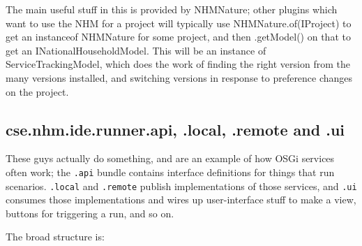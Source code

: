 \documentclass[11pt]{article}
\begin{document}
The main useful stuff in this is provided by NHMNature; other plugins which want to use the NHM for a project will typically use NHMNature.of(IProject) to get an instanceof NHMNature for some project, and then .getModel() on that to get an INationalHouseholdModel. This will be an instance of ServiceTrackingModel, which does the work of finding the right version from the many versions installed, and switching versions in response to preference changes on the project.

\subsection{cse.nhm.ide.runner.api, .local, .remote and .ui}
\label{sec-1-5}
These guys actually do something, and are an example of how OSGi services often work; the \texttt{.api} bundle contains interface definitions for things that run scenarios. \texttt{.local} and \texttt{.remote} publish implementations of those services, and \texttt{.ui} consumes those implementations and wires up user-interface stuff to make a view, buttons for triggering a run, and so on.

The broad structure is:
\end{document}
